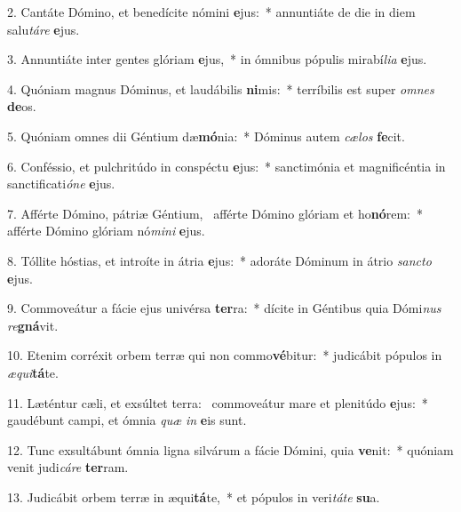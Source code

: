 2. Cantáte Dómino, et benedícite nómini \textbf{e}jus:~*  annuntiáte de die in diem salu\textit{tá}\textit{re} \textbf{e}jus.\

3. Annuntiáte inter gentes glóriam \textbf{e}jus,~*  in ómnibus pópulis mirabí\textit{li}\textit{a} \textbf{e}jus.\

4. Quóniam magnus Dóminus, et laudábilis \textbf{ni}mis:~*  terríbilis est super \textit{om}\textit{nes} \textbf{de}os.\

5. Quóniam omnes dii Géntium dæ\textbf{mó}nia:~*  Dóminus autem \textit{cæ}\textit{los} \textbf{fe}cit.\

6. Conféssio, et pulchritúdo in conspéctu \textbf{e}jus:~*  sanctimónia et magnificéntia in sanctificati\textit{ó}\textit{ne} \textbf{e}jus.\

7. Afférte Dómino, pátriæ Géntium, \dag\  afférte Dómino glóriam et ho\textbf{nó}rem:~*  afférte Dómino glóriam nó\textit{mi}\textit{ni} \textbf{e}jus.\

8. Tóllite hóstias, et introíte in átria \textbf{e}jus:~*  adoráte Dóminum in átrio \textit{sanc}\textit{to} \textbf{e}jus.\

9. Commoveátur a fácie ejus univérsa \textbf{ter}ra:~*  dícite in Géntibus quia Dómi\textit{nus} \textit{re}\textbf{gná}vit.\

10. Etenim corréxit orbem terræ qui non commo\textbf{vé}bitur:~*  judicábit pópulos in \textit{æ}\textit{qui}\textbf{tá}te.\

11. Læténtur cæli, et exsúltet terra: \dag\  commoveátur mare et plenitúdo \textbf{e}jus:~*  gaudébunt campi, et ómnia \textit{quæ} \textit{in} \textbf{e}is sunt.\

12. Tunc exsultábunt ómnia ligna silvárum a fácie Dómini, quia \textbf{ve}nit:~*  quóniam venit judi\textit{cá}\textit{re} \textbf{ter}ram.\

13. Judicábit orbem terræ in æqui\textbf{tá}te,~*  et pópulos in veri\textit{tá}\textit{te} \textbf{su}a.\

